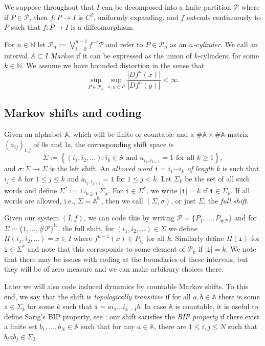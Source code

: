 \documentclass[11pt, reqno]{amsart}
\numberwithin{equation}{section}
\theoremstyle{plain}%
\theoremstyle{definition}
\def\N{\ensuremath{\mathbb N}}
\def\P{\ensuremath{\mathcal P}}
\renewcommand{\i}{\mathtt{i}}
\theoremstyle{nonumberplain}
\begin{document}
\label{sec:setup}


We suppose throughout that $I$ can be decomposed into a finite partition $\P$ where if $P\in \P$, then $f:P\to I$ is  $C^2$, uniformly expanding, and $f$ extends continuously to $\overline{P}$ such that $f:\overline{P}\to I$ is a diffeomorphism.

For $n \in\N$ let $\P_n:= \bigvee_{i=0}^{n-1}f^{-i}\P$ and refer to $P\in \P_n$ as an \emph{$n$-cylinder}.  We call an interval $A\subset I$ \emph{Markov} if it can be expressed as the union of $k$-cylinders, for some $k\in \N$. We assume we have  bounded distortion in the sense that
$$\sup_{P\in\P_n}\sup_{x, y\in P}\frac{|Df^n(x)|}{|Df^n(y)|}<\infty.$$


\subsection{Markov shifts and coding}

Given an alphabet $\mathbb{A}$, which will be finite or countable and a $\#\mathbb{A}\times \#\mathbb{A}$ matrix $(a_{ij})_{i, j}$ of 0s and 1s, the corresponding shift space is
$$\Sigma:= \left\{(i_1, i_2, \ldots): i_k\in \mathbb{A} \text{ and } a_{i_k, i_{k+1}} = 1 \text{ for all } k\ge 1\right\},$$
and $\sigma:\Sigma\to \Sigma$ is the left shift.  An \emph{allowed word $\i= i_1\cdots i_k$ of length $k$} is such that $i_j\in \mathbb{A}$ for $1\le j\le k$ and  $a_{i_j, i_{j+1}} = 1$ for $1\le j< k$. Let $\Sigma_k$ be the set of all such words and define $\Sigma^*:= \cup_{k\ge 1} \Sigma_k$.  For $\i\in \Sigma^*$, we write $|\i |= k$ if $\i\in \Sigma_k$.  If all words are allowed, i.e., $\Sigma = \mathbb{A}^{\N}$,  then we call $(\Sigma, \sigma)$, or just $\Sigma$, the  \emph{full shift}.

Given our system $(I, f)$, we can code this by writing $\P= \{P_1, \ldots, P_{\#\P}\}$ and for $\Sigma= \{ 1, \ldots, \#\P\}^{\N}$, the full shift, for $(i_1, i_2, \ldots)\in \Sigma$ we define $\Pi(i_1, i_2, \ldots) = x\in I$ where $f^{k-1}(x)\in P_{i_k}$ for all $k$.  Similarly define $\Pi(\i)$ for $\i\in \Sigma^*$ and note that this corresponds to some element of $\P_k$ if $|\i|=k$.  We note that there may be issues with coding at the boundaries of these intervals, but they will be of zero measure and we can make arbitrary choices there.

Later we will also code induced dynamics by countable Markov shifts. To this end, we say that the shift is \emph{topologically transitive} if for all $a, b\in \mathbb{A}$ there is some $\i\in \Sigma_k$ for some $k$  such that $\i= ai_2\ldots i_{k-1}b$.  In case $\mathbb{A}$ is countable, it is useful to define 
 Sarig's BIP property, see \cite{Sar03}: our shift satisfies the \emph{BIP property} if there exist a finite set $b_1, \ldots, b_N\in \mathbb{A}$ such that for any $a\in \mathbb{A}$, there are $1\le i, j\le N$ such that $b_iab_j\in \Sigma_3$. 
 
\end{document}
